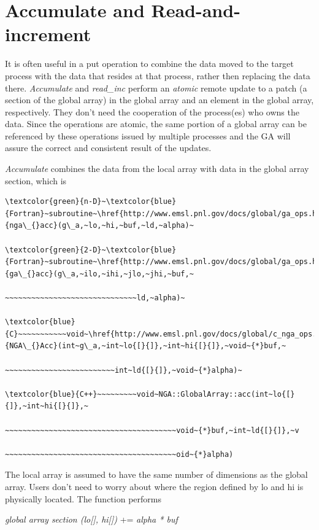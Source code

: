 \section{Accumulate and Read-and-increment }

It is often useful in a put operation to combine the data moved to
the target process with the data that resides at that process, rather
then replacing the data there. \emph{Accumulate} and \emph{read\_inc}
perform an \emph{atomic} remote update to a patch (a section of the
global array) in the global array and an element in the global array,
respectively. They don't need the cooperation of the process(es) who
owns the data. Since the operations are atomic, the same portion of
a global array can be referenced by these operations issued by multiple
processes and the GA will assure the correct and consistent result
of the updates.

\emph{Accumulate} combines the data from the local array with data
in the global array section, which is
\begin{verbatim}
\textcolor{green}{n-D}~\textcolor{blue}{Fortran}~subroutine~\href{http://www.emsl.pnl.gov/docs/global/ga_ops.html\#ga_acc}{nga\_{}acc}(g\_a,~lo,~hi,~buf,~ld,~alpha)~

\textcolor{green}{2-D}~\textcolor{blue}{Fortran}~subroutine~\href{http://www.emsl.pnl.gov/docs/global/ga_ops.html\#ga_acc}{ga\_{}acc}(g\_a,~ilo,~ihi,~jlo,~jhi,~buf,~

~~~~~~~~~~~~~~~~~~~~~~~~~~~~~~ld,~alpha)~

\textcolor{blue}{C}~~~~~~~~~~~void~\href{http://www.emsl.pnl.gov/docs/global/c_nga_ops.html\#ga_acc}{NGA\_{}Acc}(int~g\_a,~int~lo{[}{]},~int~hi{[}{]},~void~{*}buf,~

~~~~~~~~~~~~~~~~~~~~~~~~~int~ld{[}{]},~void~{*}alpha)~

\textcolor{blue}{C++}~~~~~~~~~void~NGA::GlobalArray::acc(int~lo{[}{]},~int~hi{[}{]},~

~~~~~~~~~~~~~~~~~~~~~~~~~~~~~~~~~~~~~~~void~{*}buf,~int~ld{[}{]},~v

~~~~~~~~~~~~~~~~~~~~~~~~~~~~~~~~~~~~~~~oid~{*}alpha)
\end{verbatim}
The local array is assumed to have the same number of dimensions as
the global array. Users don't need to worry about where the region
defined by lo and hi is physically located. The function performs

\emph{global array section (lo{[}{]}, hi{[}{]})} += \emph{alpha {*}
buf}

